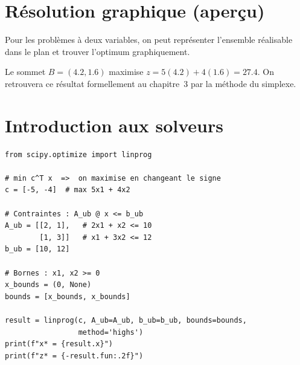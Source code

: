 \section{R\'esolution graphique (aper\c{c}u)}

Pour les probl\`emes \`a deux variables, on peut repr\'esenter l'ensemble
r\'ealisable dans le plan et trouver l'optimum graphiquement.

\begin{center}
\end{center}

Le sommet $B = (4.2, 1.6)$ maximise $z = 5(4.2) + 4(1.6) = 27.4$.
On retrouvera ce r\'esultat formellement au chapitre~3 par la m\'ethode du
simplexe.

\section{Introduction aux solveurs}

\begin{codeblock}[title=\textbf{R\'esolution avec SciPy}]
\begin{verbatim}
from scipy.optimize import linprog

# min c^T x  =>  on maximise en changeant le signe
c = [-5, -4]  # max 5x1 + 4x2

# Contraintes : A_ub @ x <= b_ub
A_ub = [[2, 1],   # 2x1 + x2 <= 10
        [1, 3]]   # x1 + 3x2 <= 12
b_ub = [10, 12]

# Bornes : x1, x2 >= 0
x_bounds = (0, None)
bounds = [x_bounds, x_bounds]

result = linprog(c, A_ub=A_ub, b_ub=b_ub, bounds=bounds,
                 method='highs')
print(f"x* = {result.x}")
print(f"z* = {-result.fun:.2f}")
\end{verbatim}
\end{codeblock}


